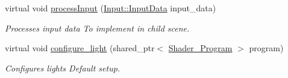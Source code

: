 \begin{DoxyCompactItemize}
virtual void \mbox{\hyperlink{classoglsl_1_1_scene_a7884a3f2b7900aaf348a62ad23223c8e}{process\+Input}} (\mbox{\hyperlink{classoglsl_1_1_input_a3b21d7328538e661f366af5d6059c197}{Input\+::\+Input\+Data}} input\+\_\+data)
\begin{DoxyCompactList}\small\item\em Processes input data To implement in child scene. \end{DoxyCompactList}\item 
virtual void \mbox{\hyperlink{classoglsl_1_1_scene_a91c975ee306374f17b9f348801f2ce3e}{configure\+\_\+light}} (shared\+\_\+ptr$<$ \mbox{\hyperlink{classoglsl_1_1_shader___program}{Shader\+\_\+\+Program}} $>$ program)
\begin{DoxyCompactList}\small\item\em Configures lights Default setup. \end{DoxyCompactList}\end{DoxyCompactItemize}
